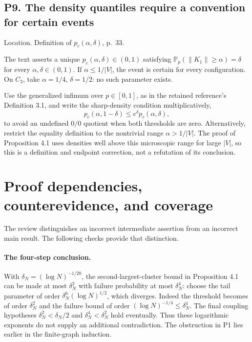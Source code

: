 \documentclass[10pt]{article}
\begin{document}
\subsection*{P9. The density quantiles require a convention for certain events}
Location. Definition of \(p_c(\alpha,\delta)\), p. 33.\par
The text asserts a unique \(p_c(\alpha,\delta)\in(0,1)\) satisfying \(\mathbb P_p(\|K_1\|\ge\alpha)=\delta\) for every \(\alpha,\delta\in(0,1)\). If \(\alpha\le1/|V|\), the event is certain for every configuration. On \(C_3\), take \(\alpha=1/4\), \(\delta=1/2\): no such parameter exists.\par
Use the generalized infimum over \(p\in[0,1]\), as in the retained reference’s Definition 3.1, and write the sharp-density condition multiplicatively, \[p_c(\alpha,1-\delta)\le e^\delta p_c(\alpha,\delta),\] to avoid an undefined \(0/0\) quotient when both thresholds are zero. Alternatively, restrict the equality definition to the nontrivial range \(\alpha>1/|V|\). The proof of Proposition 4.1 uses densities well above this microscopic range for large \(|V|\), so this is a definition and endpoint correction, not a refutation of its conclusion.\par
\section*{Proof dependencies, counterevidence, and coverage}
The review distinguishes an incorrect intermediate assertion from an incorrect main result. The following checks provide that distinction.\par
\paragraph*{The four-step conclusion.}\mbox{}\par
With \(\delta_N=(\log N)^{-1/20}\), the second-largest-cluster bound in Proposition 4.1 can be made at most \(\delta_N^2\) with failure probability at most \(\delta_N^4\): choose the tail parameter of order \(\delta_N^6(\log N)^{1/2}\), which diverges. Indeed the threshold becomes of order \(\delta_N^2\) and the failure bound of order \((\log N)^{-1/4}\le\delta_N^4\). The final coupling hypotheses \(\delta_N^2<\delta_N/2\) and \(\delta_N^4<\delta_N^2\) hold eventually. Thus these logarithmic exponents do not supply an additional contradiction. The obstruction in P1 lies earlier in the finite-graph induction.\par
\end{document}
